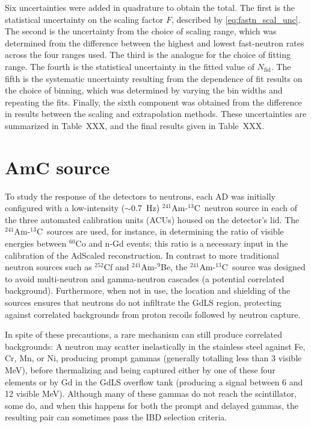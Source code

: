 \documentclass[../thesis.tex]{subfiles}
\begin{document}
Six uncertainties were added in quadrature to obtain the total. The first is the statistical uncertainty on the scaling factor $F$, described by \eqref{eq:fastn_scal_unc}. The second is the uncertainty from the choice of scaling range, which was determined from the difference between the highest and lowest fast-neutron rates across the four ranges used. The third is the analogue for the choice of fitting range. The fourth is the statistical uncertainty in the fitted value of $N_\mathrm{fid}$. The fifth is the systematic uncertainty resulting from the dependence of fit results on the choice of binning, which was determined by varying the bin widths and repeating the fits. Finally, the sixth component was obtained from the difference in results between the scaling and extrapolation methods. These uncertainties are summarized in Table~XXX, and the final results given in Table~XXX.

\newcommand\AmC{$^{241}$Am-$^{13}$C}

\section{AmC source}
\label{sec:bkgAmC}

To study the response of the detectors to neutrons, each AD was initially configured with a low-intensity ($\sim$0.7~Hz) \AmC\ neutron source in each of the three automated calibration units (ACUs) housed on the detector's lid. The \AmC\ sources are used, for instance, in determining the ratio of visible energies between $^{60}$Co and n-Gd events; this ratio is a necessary input in the calibration of the AdScaled reconstruction. In contrast to more traditional neutron sources such as $^{252}$Cf and $^{241}$Am-$^{9}$Be, the \AmC\ source was designed to avoid multi-neutron and gamma-neutron cascades (a potential correlated background). Furthermore, when not in use, the location and shielding of the sources ensures that neutrons do not infiltrate the GdLS region, protecting against correlated backgrounds from proton recoils followed by neutron capture.

In spite of these precautions, a rare mechanism can still produce correlated backgrounds: A neutron may scatter inelastically in the stainless steel against Fe, Cr, Mn, or Ni, producing prompt gammas (generally totalling less than 3 visible MeV), before thermalizing and being captured either by one of these four elements or by Gd in the GdLS overflow tank (producing a signal between 6 and 12 visible MeV). Although many of these gammas do not reach the scintillator, some do, and when this happens for both the prompt and delayed gammas, the resulting pair can sometimes pass the IBD selection criteria.
\end{document}
